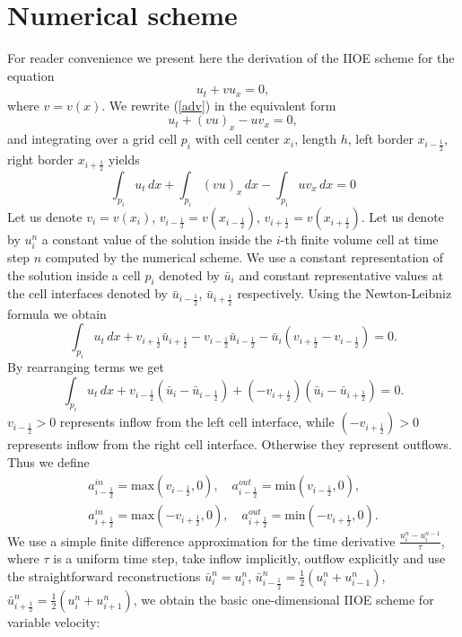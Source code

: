 \documentclass[a4paper,12pt,twoside]{report}%
\newcounter{eqn}
\begin{document}
\section{Numerical scheme}
For reader convenience we present here the derivation of the IIOE scheme \cite{iioe0,iioe1,iioe2} for the equation
\begin{equation}
	u_t + vu_x = 0, 
	\label{adv}
\end{equation}
where $ v = v(x) $. We rewrite (\ref{adv}) in the equivalent form
\begin{equation}
	u_t + (vu)_x - uv_x = 0,
	\label{adv1}
\end{equation}
and integrating over a grid cell $ p_i $ with cell center $ x_i $, length $ h $, left border $ x_{i-\frac{1}{2}} $, right border $ x_{i+\frac{1}{2}} $ yields
\[ \int_{p_i} u_t\, dx + 
\int_{p_i}(vu)_x\, dx - 
\int_{p_i} uv_x\, dx = 0\]
Let us denote $ v_i = v(x_i) $, $ v_{i - \frac{1}{2}} = v(x_{i-\frac{1}{2}}) $, $ v_{i + \frac{1}{2}} = v(x_{i+\frac{1}{2}}) $. Let us denote by $ u_i^n $ a constant value of the solution inside the $ i $-th finite volume cell at time step $ n $ computed by the numerical scheme. We use a constant representation of the solution inside a cell $ p_i $ denoted by $ \bar u_i $ and constant representative values at the cell interfaces denoted by $ \bar u_{i - \frac{1}{2}} $, $ \bar u_{i + \frac{1}{2}} $ respectively. Using the Newton-Leibniz formula we obtain
\[ \int_{p_i} u_t\, dx +
v_{i + \frac{1}{2}} \bar u_{i + \frac{1}{2}} - v_{i - \frac{1}{2}} \bar u_{i - \frac{1}{2}} - 
\bar u_i (v_{i + \frac{1}{2}} - v_{i - \frac{1}{2}}) = 0. \]
By rearranging terms we get
\[\int_{p_i} u_t\, dx + 
v_{i - \frac{1}{2}}(\bar u_i - \bar u_{i - \frac{1}{2}}) + (-v_{i + \frac{1}{2}})(\bar u_i - \bar u_{i + \frac{1}{2}}) = 0.\]
$ v_{i - \frac{1}{2}} > 0 $ represents inflow from the left cell interface, while $ (-v_{i + \frac{1}{2}}) > 0 $ represents inflow from the right cell interface. Otherwise they represent outflows. Thus we define
\begin{eqnarray*}
	a^{in}_{i-\frac{1}{2}} = \textrm{max}(v_{i-\frac{1}{2}},0),\quad 
	a^{out}_{i-\frac{1}{2}} = \textrm{min}(v_{i-\frac{1}{2}},0), 
	\\
	a^{in}_{i+\frac{1}{2}} = \textrm{max}(-v_{i+\frac{1}{2}},0),\quad 
	a^{out}_{i+\frac{1}{2}} = \textrm{min}(-v_{i+\frac{1}{2}},0). 
\end{eqnarray*}
We use a simple finite difference approximation for the time derivative $ \frac{u^n_i - u^{n-1}_i}{\tau} $,
where $ \tau $ is a uniform time step, take inflow implicitly, outflow explicitly and use the straightforward reconstructions $ \bar u_i^n = u^n_i $, $ \bar u_{i - \frac{1}{2}}^n = \frac{1}{2} (u_i^n + u_{i-1}^n) $, $ \bar u_{i + \frac{1}{2}}^n = \frac{1}{2} (u_i^n + u_{i+1}^n) $, we obtain the basic one-dimensional IIOE scheme for variable velocity:
\end{document}

